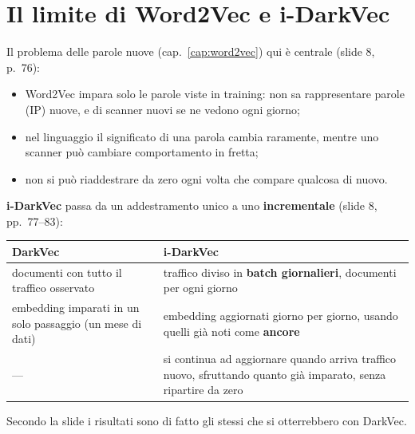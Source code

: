 \section{Il limite di Word2Vec e i-DarkVec}
Il problema delle parole nuove (cap.~\ref{cap:word2vec}) qui è centrale (slide 8, p.~76):
\begin{itemize}
  \item Word2Vec impara solo le parole viste in training: non sa rappresentare parole (IP) nuove, e di scanner nuovi se ne vedono
        ogni giorno;
  \item nel linguaggio il significato di una parola cambia raramente, mentre uno scanner può cambiare comportamento in fretta;
  \item non si può riaddestrare da zero ogni volta che compare qualcosa di nuovo.
\end{itemize}
\textbf{i-DarkVec} passa da un addestramento unico a uno \textbf{incrementale} (slide 8, pp.~77--83):
\begin{center}
\small
\begin{tabularx}{\textwidth}{X X}
\toprule
\textbf{DarkVec} & \textbf{i-DarkVec}\\
\midrule
documenti con tutto il traffico osservato & traffico diviso in \textbf{batch giornalieri}, documenti per ogni giorno\\
embedding imparati in un solo passaggio (un mese di dati) & embedding aggiornati giorno per giorno, usando quelli già noti come
\textbf{ancore}\\
--- & si continua ad aggiornare quando arriva traffico nuovo, sfruttando quanto già imparato, senza ripartire da zero\\
\bottomrule
\end{tabularx}
\end{center}
Secondo la slide i risultati sono di fatto gli stessi che si otterrebbero con DarkVec.

